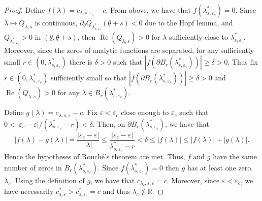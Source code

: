 \documentclass[11pt]{article}    %
\newcommand{\R}{\mathbb{R}}
\renewcommand{\epsilon}{\varepsilon}
\newcommand{\eps}{\varepsilon}
\DeclareMathOperator{\Real}{Re}
\begin{document}
\begin{proof}
Define $f(\lambda) = c_{\lambda, s, \epsilon_c} - c$. From above, we have that $f(\lambda_{s,\epsilon_c}^*) = 0$. Since $\lambda \mapsto Q_{\lambda,s}$ is continuous, 
$\partial_\theta Q_{\lambda_{s,\epsilon_c}^*}(\underline\theta+s) < 0$ due to the Hopf lemma, and $Q_{\lambda_{s,\epsilon_c}^*} > 0$ in $(\underline\theta,\underline\theta+s)$, then $\Real(Q_{\lambda,s}) > 0$ for $\lambda$ sufficiently close to $\lambda_{s,\epsilon_c}^*$. 
Moreover, since the zeros of analytic functions are separated, for any sufficiently small $r \in (0,\lambda_{s,\epsilon_c}^*)$ there is $\delta>0$ such that $|f(\partial B_r(\lambda_{s,\epsilon_c}^*))| \geq \delta > 0$. Thus fix $r \in (0,\lambda_{s,\epsilon_c}^*)$ sufficiently small so that $|f(\partial B_r(\lambda_{s,\epsilon_c}^*))| \geq \delta > 0$ and $\Real(Q_{\lambda,s}) > 0$ for any $\lambda \in B_r(\lambda_{s,\epsilon_c}^*)$. 

Define $g(\lambda) =  c_{\lambda, s, \epsilon}  - c$. Fix $\eps < \eps_c$ close enough to $\eps_c$ such that $0 < \vert \eps_c - \eps\vert/(\lambda_{s,\epsilon_c}^* - r) < \delta$.  Then, on $\partial B_r(\lambda_{s,\epsilon_c}^*)$, we have that
\[
	|f(\lambda) - g(\lambda)|
		= \frac{\vert \eps_c - \eps \vert}{|\lambda|}
		\leq \frac{\vert \eps_c - \eps \vert}{\lambda_{s,\epsilon_c}^* - r}
		< \delta
		\leq |f(\lambda)|
		\leq |f(\lambda)| + |g(\lambda)|.
\]
Hence the hypotheses of Rouch\'e's theorem are met.  Thus, $f$ and $g$ have the same number of zeros in $B_r(\lambda_{s,\epsilon_c}^*)$.  Since $f(\lambda_{s,\epsilon_c}^*) = 0$ then $g$ has at least one zero, $\lambda_c$.  Using the definition of $g$, we have that $c_{\lambda_c,s,\eps} = c$. Moreover, since $\eps < \eps_c$, we have necessarily $c_{s,\eps}^* > c_{s,\eps_c}^* = c$ and thus $\lambda_c \not\in \R$.
%
%
%


\end{proof}
\end{document}
